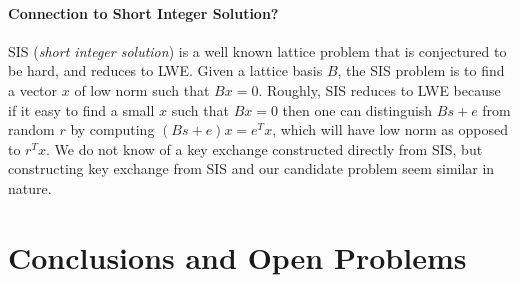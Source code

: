\documentclass[letterpaper,twocolumn,10pt]{article}
\begin{document}
\paragraph{Connection to Short Integer Solution?} SIS (\emph{short integer solution}) is a well known lattice problem that is conjectured to be hard, and reduces to LWE. Given a lattice basis $B$, the SIS problem is to find a vector $x$ of low norm such that $B x = 0$. Roughly, SIS reduces to LWE because if it easy to find a small $x$ such that $Bx = 0$ then one can distinguish $Bs + e$ from random $r$ by computing $(Bs + e) x = e^T x$, which will have low norm as opposed to $r^T x$. We do not know of a key exchange constructed directly from SIS, but constructing key exchange from SIS and our candidate problem seem similar in nature. 

\section{Conclusions and Open Problems}




{\footnotesize 
}


\end{document}
